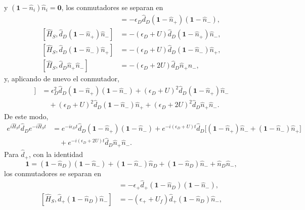 \begin{appendixs}
\[\]
y $(\mathbf{1}-\hat{n}_{i})\hat{n}_{i}=\mathbf{0}$, los conmutadores se separan en
\begin{align*}
    [\hat{H}_{S},\hat{d}_{D}(\mathbf{1}-\hat{n}_{+})(\mathbf{1} - \hat{n}_{-})] & = - \epsilon_{D}\hat{d}_{D}(\mathbf{1}-\hat{n}_{+})(\mathbf{1} - \hat{n}_{-}), \\
    [\hat{H}_{S},\hat{d}_{D}(\mathbf{1}-\hat{n}_{+})\hat{n}_{-}] & = - (\epsilon_{D} + U)\hat{d}_{D}(\mathbf{1} - \hat{n}_{+})\hat{n}_{-}, \\
    [\hat{H}_{S},\hat{d}_{D}(\mathbf{1}-\hat{n}_{-})\hat{n}_{+}] & = - (\epsilon_{D} + U)\hat{d}_{D}(\mathbf{1} - \hat{n}_{-})\hat{n}_{+}, \\
    [\hat{H}_{S},\hat{d}_{D}\hat{n}_{+}\hat{n}_{-}] & = - (\epsilon_{D} + 2U)\hat{d}_{D}\hat{n}_{+}\hat{n}_{-},
\end{align*}
y, aplicando de nuevo el conmutador,
\begin{align*}
    [\hat{H}_{S},[\hat{H}_{S},\hat{d}_{D}]] & =
    \epsilon_{D}^{2}\hat{d}_{D}(\mathbf{1} - \hat{n}_{+}) (\mathbf{1} - \hat{n}_{-})
    + (\epsilon_{D} + U)^{2}\hat{d}_{D}(\mathbf{1} - \hat{n}_{+})\hat{n}_{-} \\
    & \quad + (\epsilon_{D}+U)^{2}\hat{d}_{D}(\mathbf{1} - \hat{n}_{-})\hat{n}_{+}
    + (\epsilon_{D} + 2U)^{2}\hat{d}_{D}\hat{n}_{+}\hat{n}_{-}.
\end{align*}
De este modo,
\begin{align*}
    e^{i \hat{H}_{S}t}\hat{d}_{D}e^{-i\hat{H}_{S}t}  & =
    e^{-i\epsilon_{D}t} \hat{d}_{D}(\mathbf{1} - \hat{n}_{+}) (\mathbf{1} - \hat{n}_{-})
    +  e^{-i(\epsilon_{D}+U)t} \hat{d}_{D}\big[(\mathbf{1} - \hat{n}_{+})\hat{n}_{-} + (\mathbf{1} - \hat{n}_{-})\hat{n}_{+}\big] \\
    & \quad + e^{-i(\epsilon_{D} + 2U)t}\hat{d}_{D} \hat{n}_{+}\hat{n}_{-}.
\end{align*}
Para $\hat{d}_{+}$, con la identidad
\[
\mathbf{1} = (\mathbf{1}-\hat{n}_{D})(\mathbf{1}-\hat{n}_{-}) + (\mathbf{1}-\hat{n}_{-})\hat{n}_{D} + (\mathbf{1}-\hat{n}_{D})\hat{n}_{-} + \hat{n}_{D}\hat{n}_{-},
\]
los conmutadores se separan en
\begin{align*}
    [\hat{H}_{S},\hat{d}_{+}(\mathbf{1}-\hat{n}_{D})(\mathbf{1} - \hat{n}_{-})] & = - \epsilon_{+}\hat{d}_{+}(\mathbf{1}-\hat{n}_{D})(\mathbf{1} - \hat{n}_{-}), \\
    [\hat{H}_{S},\hat{d}_{+}(\mathbf{1}-\hat{n}_{D})\hat{n}_{-}] & = - (\epsilon_{+} + U_{f})\hat{d}_{+}(\mathbf{1}-\hat{n}_{D})\hat{n}_{-}, \\

\end{align*}
\end{appendixs}
